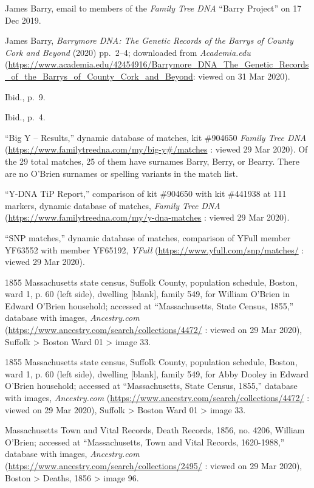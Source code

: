 \begin{thebibliography}{999}
	James Barry, email to members of the \textit{Family Tree DNA} ``Barry Project'' on 17 Dec 2019.
	
	James Barry, \textit{Barrymore DNA: The Genetic Records of the Barrys of County Cork and Beyond} (2020) pp.\ 2--4; downloaded from \textit{Academia.edu} (\url{https://www.academia.edu/42454916/Barrymore_DNA_The_Genetic_Records_of_the_Barrys_of_County_Cork_and_Beyond}: viewed on 31 Mar 2020).
	
	Ibid., p.\ 9.
	
	Ibid., p.\ 4.
	
	``Big Y -- Results,'' dynamic database of matches, kit \#904650 \textit{Family Tree DNA} (\url{https://www.familytreedna.com/my/big-y#/matches} : viewed 29 Mar 2020). Of the 29 total matches, 25 of them have surnames Barry, Berry, or Bearry. There are no O'Brien surnames or spelling variants in the match list.
	
	``Y-DNA TiP Report,'' comparison of kit \#904650 with kit \#441938 at 111 markers, dynamic database of matches, \textit{Family Tree DNA} (\url{https://www.familytreedna.com/my/y-dna-matches} : viewed 29 Mar 2020).
	
	``SNP matches,'' dynamic database of matches, comparison of YFull member YF63552 with member YF65192, \textit{YFull} (\url{https://www.yfull.com/snp/matches/} : viewed 29 Mar 2020).
	
	1855 Massachusetts state census, Suffolk County, population schedule, Boston, ward 1, p. 60 (left side), dwelling [blank], family 549, for William O'Brien in Edward O'Brien household; accessed at ``Massachusetts, State Census, 1855,'' database with images, \textit{Ancestry.com} (\url{https://www.ancestry.com/search/collections/4472/} : viewed on 29 Mar 2020), Suffolk > Boston Ward 01 > image 33.
	
	1855 Massachusetts state census, Suffolk County, population schedule, Boston, ward 1, p. 60 (left side), dwelling [blank], family 549, for Abby Dooley in Edward O'Brien household; accessed at ``Massachusetts, State Census, 1855,'' database with images, \textit{Ancestry.com} (\url{https://www.ancestry.com/search/collections/4472/} : viewed on 29 Mar 2020), Suffolk > Boston Ward 01 > image 33.
		
	Massachusetts Town and Vital Records, Death Records, 1856, no. 4206, William O'Brien; accessed at ``Massachusetts, Town and Vital Records, 1620-1988,'' database with images, \textit{Ancestry.com} (\url{https://www.ancestry.com/search/collections/2495/} : viewed on 29 Mar 2020), Boston > Deaths, 1856 > image 96.
		

\end{thebibliography}
